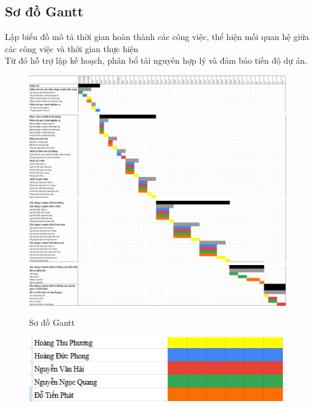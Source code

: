 \subsection{Sơ đồ Gantt}
\noindent Lập biểu đồ mô tả thời gian hoàn thành các công việc, thể hiện mối quan hệ giữa các công việc và thời gian thực hiện\\
\noindent Từ đó hỗ trợ lập kế hoạch, phân bổ tài nguyên hợp lý và đảm bảo tiến độ dự án.
\begin{figure}[H]
    \centering
    \includegraphics[width=\textwidth]{images/gantt1.png}
    \includegraphics[width=\textwidth]{images/gantt2.png}
    \includegraphics[width=\textwidth]{images/gantt3.png}
    \includegraphics[width=\textwidth]{images/gantt4.png}
    \caption{Sơ đồ Gantt}
\end{figure}
\begin{figure}[H]
    \centering
    \includegraphics[width=\textwidth]{images/gantt_tv.png}
\end{figure}

